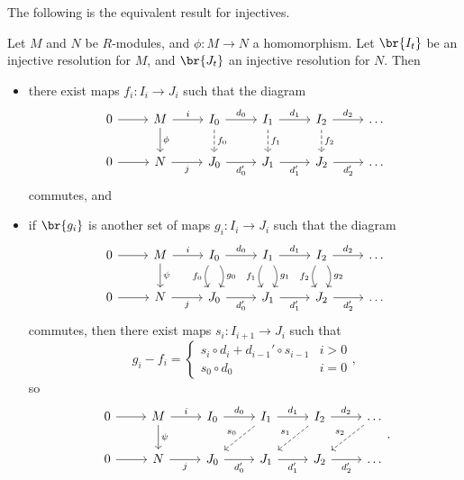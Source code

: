 The following is the equivalent result for injectives.

\begin{proposition}
Let $ M $ and $ N $ be $ R $-modules, and $ \phi : M \to N $ a homomorphism. Let $ \br{I_t} $ be an injective resolution for $ M $, and $ \br{J_t} $ an injective resolution for $ N $. Then
\begin{itemize}
\item there exist maps $ f_i : I_i \to J_i $ such that the diagram
$$
\begin{tikzcd}
0 \arrow{r} & M \arrow{r}{i} \arrow{d}{\phi} & I_0 \arrow{r}{d_0} \arrow[dashed]{d}{f_0} & I_1 \arrow{r}{d_1} \arrow[dashed]{d}{f_1} & I_2 \arrow{r}{d_2} \arrow[dashed]{d}{f_2} & \dots \\
0 \arrow{r} & N \arrow{r}[swap]{j} & J_0 \arrow{r}[swap]{d_0'} & J_1 \arrow{r}[swap]{d_1'} & J_2 \arrow{r}[swap]{d_2'} & \dots
\end{tikzcd}
$$
commutes, and
\item if $ \br{g_i} $ is another set of maps $ g_i : I_i \to J_i $ such that the diagram
$$
\begin{tikzcd}
0 \arrow{r} & M \arrow{r}{i} \arrow{d}{\psi} & I_0 \arrow{r}{d_0} \arrow[bend right=30]{d}[swap]{f_0} \arrow[bend left=30]{d}{g_0} & I_1 \arrow{r}{d_1} \arrow[bend right=30]{d}[swap]{f_1} \arrow[bend left=30]{d}{g_1} & I_2 \arrow{r}{d_2} \arrow[bend right=30]{d}[swap]{f_2} \arrow[bend left=30]{d}{g_2} & \dots \\
0 \arrow{r} & N \arrow{r}[swap]{j} & J_0 \arrow{r}[swap]{d_0'} & J_1 \arrow{r}[swap]{d_1'} & J_2 \arrow{r}[swap]{d_2'} & \dots
\end{tikzcd}
$$
commutes, then there exist maps $ s_i : I_{i + 1} \to J_i $ such that
$$ g_i - f_i =
\begin{cases}
s_i \circ d_i + d_{i - 1}' \circ s_{i - 1} & i > 0 \\
s_0 \circ d_0 & i = 0
\end{cases},
$$
so
$$
\begin{tikzcd}
0 \arrow{r} & M \arrow{r}{i} \arrow{d}{\psi} & I_0 \arrow{r}{d_0} & I_1 \arrow{r}{d_1} \arrow[dashed]{dl}[swap]{s_0} & I_2 \arrow{r}{d_2} \arrow[dashed]{dl}[swap]{s_1} & \dots \arrow[dashed]{dl}[swap]{s_2} \\
0 \arrow{r} & N \arrow{r}[swap]{j} & J_0 \arrow{r}[swap]{d_0'} & J_1 \arrow{r}[swap]{d_1'} & J_2 \arrow{r}[swap]{d_2'} & \dots
\end{tikzcd}.
$$
\end{itemize}
\end{proposition}

